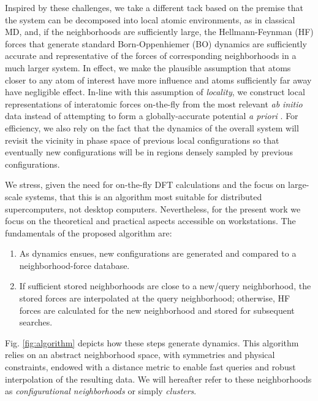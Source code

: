 \documentclass[journal=jctcce,manuscript=article]{achemso}
\newcommand{\fref}[1]{{Fig. \ref{#1}}}
\newcommand{\eg}{{\it e.g.\ }}
\newcommand{\apriori}{{\it a priori }}
\newcommand{\abinitio}{{\it ab initio }}
\begin{document}
Inspired by these challenges, we take a different tack based on the premise that the system can be decomposed into local atomic environments, as in classical MD, and, if the neighborhoods are sufficiently large, the Hellmann-Feynman (HF) forces that generate standard Born-Oppenhiemer (BO) dynamics are sufficiently accurate and representative of the forces of corresponding neighborhoods in a much larger system. 
In effect, we make the plausible assumption that atoms closer to any atom of interest have more influence and atoms sufficiently far away have negligible effect.
In-line with this assumption of \emph{locality}, we construct local representations of interatomic forces on-the-fly from the most relevant \abinitio data instead of attempting to form a globally-accurate potential \apriori.
For efficiency, we also rely on the fact that the dynamics of the overall system will revisit the vicinity in phase space of previous local configurations \cite{mazur1960poincare,saito1970computer,hoover1988reversible} so that eventually new configurations will be in regions densely sampled by previous configurations.


We stress, given the need for on-the-fly DFT calculations and the focus on large-scale systems, that this is an algorithm most suitable for distributed supercomputers, not desktop computers.
Nevertheless,
for the present work we focus on the theoretical and practical aspects accessible on workstations. %
The fundamentals of the proposed algorithm are:
\begin{enumerate} 
\item
As dynamics ensues, new configurations are generated and compared to a neighborhood-force database. 
\item 
If sufficient stored neighborhoods are close to a new/query neighborhood, the stored forces are interpolated at the query neighborhood;
 otherwise, HF forces are calculated for the new neighborhood and stored for subsequent searches.
\end{enumerate}
\fref{fig:algorithm} depicts how these steps generate dynamics.
This algorithm relies on an abstract neighborhood space, with symmetries and physical constraints, endowed with a distance metric to enable fast queries and robust interpolation of the resulting data.
We will hereafter refer to these neighborhoods  as \emph{configurational neighborhoods} or simply \emph{clusters}.
\end{document}
